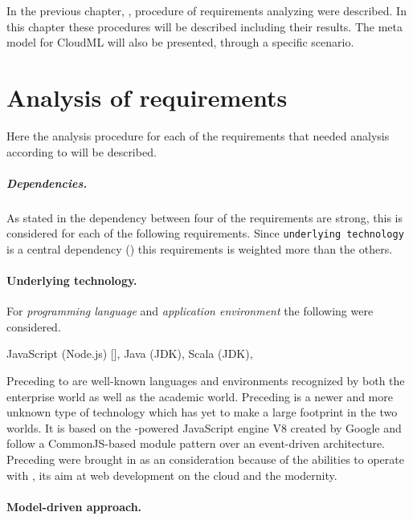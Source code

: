




In the previous chapter, , procedure of requirements analyzing
were described.
In this chapter these procedures will be described including their results.
The meta model for CloudML will also be presented, through a specific scenario.

\section{Analysis of requirements}

Here the analysis procedure for each of the requirements 
that needed analysis according to  will be described.

\subparagraph{Dependencies.}

As stated in  the dependency between four of the requirements
are strong, this is considered for each of the following requirements.
Since \texttt{underlying technology} is a central dependency ()
this requirements is weighted more than the others.

\paragraph{Underlying technology.}

For \emph{programming language} and \emph{application environment} the following were considered.
\begin{ii}
  \iitem JavaScript (Node.js) [],
  \iitem Java (JDK),
  \iitem Scala (JDK),
\end{ii}
Preceding  to  are well-known languages and environments recognized by both the enterprise world as well as the academic world.
Preceding  is a newer and more unknown type of technology which has yet to 
make a large footprint in the two worlds. 
It is based on the -powered JavaScript engine V8 created by Google and follow a 
CommonJS-based module pattern over an event-driven architecture.
Preceding  were brought in as an consideration because of the abilities to operate
with , its aim at web development on the cloud and the modernity.

\paragraph{Model-driven approach.}

